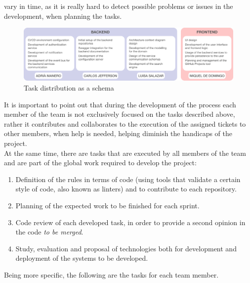 \documentclass[../memory.tex]{subfiles}
\begin{document}
vary in time, as it is really hard to detect possible problems or issues in the
development, when planning the tasks.
\begin{figure}[H]
	\centering
	\includegraphics[width=\textwidth]{./assets/planning-organization.png}
	\caption{Task distribution as a schema}
\end{figure}
It is important to point out that during the development of the process each
member of the team is not exclusively focused on the tasks described above,
rather it contributes and collaborates to the execution of the assigned tickets
to other members, when help is needed, helping diminish the handicaps of the
project.
\\
At the same time, there are tasks that are executed by all members of the team
and are part of the global work required to develop the project:
\begin{enumerate}[label = -]
	\item Definition of the rules in terms of code (using tools that validate a
	      certain style of code, also known as linters) and to contribute to each
	      repository.
	\item Planning of the expected work to be finished for each sprint.
	\item Code review of each developed task, in order to provide a second opinion
	      in the code \emph{to be merged}.
	\item Study, evaluation and proposal of technologies both for development and
	      deployment of the systems to be developed.
\end{enumerate}
Being more specific, the following are the tasks for each team member.
\end{document}
